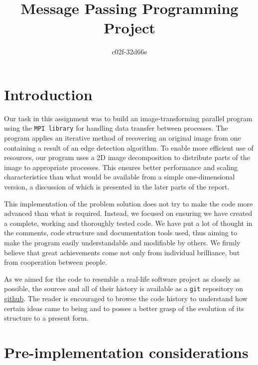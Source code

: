 \documentclass[11pt,a4paper]{article}
\begin{document}
\title{Message Passing Programming Project}
\author{c02f-32d66e}
\maketitle

\section{Introduction}
Our task in this assignment was to build an image-transforming parallel program using the \texttt{MPI library} for handling data transfer between processes.
The program applies an iterative method of recovering an original image from one containing a result of an edge detection algorithm. 
To enable more efficient use of resources, our program uses a 2D image decomposition to distribute parts of the image to appropriate processes. 
This ensures better performance and scaling characteristics than what would be available from a simple one-dimensional version, a discussion of which is presented in the later parts of the report.

This implementation of the problem solution does not try to make the code more advanced than what is required. 
Instead, we focused on ensuring we have created a complete, working and thoroughly tested code. 
We have put a lot of thought in the comments, code structure and documentation tools used, thus aiming to make the program easily understandable and modifiable by others. 
We firmly believe that great achievements come not only from individual brilliance, but from cooperation between people.

As we aimed for the code to resemble a real-life software project as closely as possible, the sources and all of their history is available as a \texttt{git} repository on \href{https://github.com/mkawalec/5thyear/tree/master/mpp/MPP-casestudy}{github}. 
The reader is encouraged to browse the code history to understand how certain ideas came to being and to posses a better grasp of the evolution of its structure to a present form.

\section{Pre-implementation considerations}
\end{document}
